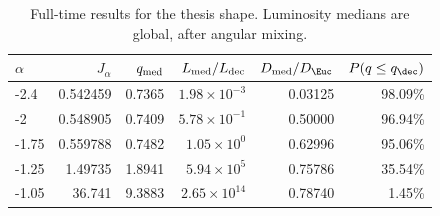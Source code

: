 \begin{table}[H]\centering\small
\renewcommand{\arraystretch}{1.15}
\caption{Full-time results for the thesis shape. Luminosity medians are global, after angular mixing.}
\begin{tabular}{@{}lrrrrr@{}}
\toprule
$\alpha$ & $J_\alpha$ & $q_{\rm med}$ & $L_{\rm med}/L_{\rm dec}$ & $D_{\rm med}/D_\Euc$ & $P(q\le q_\dec)$ \\\midrule
-2.4 & 0.542459 & 0.7365 & $1.98\times10^{-3}$ & 0.03125 & 98.09\% \\
-2 & 0.548905 & 0.7409 & $5.78\times10^{-1}$ & 0.50000 & 96.94\% \\
-1.75 & 0.559788 & 0.7482 & $1.05\times10^{0}$ & 0.62996 & 95.06\% \\
-1.25 & 1.49735 & 1.8941 & $5.94\times10^{5}$ & 0.75786 & 35.54\% \\
-1.05 & 36.741 & 9.3883 & $2.65\times10^{14}$ & 0.78740 & 1.45\% \\
\bottomrule\end{tabular}\end{table}

